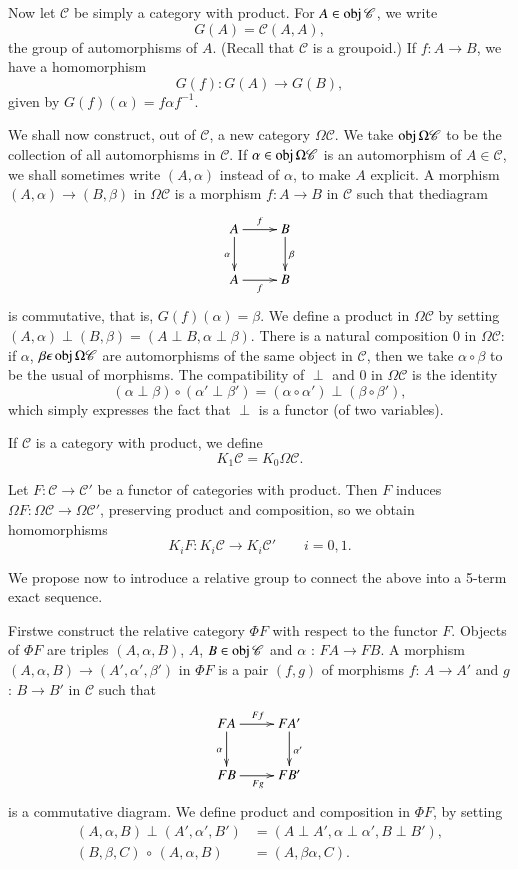 Now let $\mathscr{C}$ be simply a category with product. For $A \in
\operatorname{obj} \mathscr{C}$, we write 
$$
G(A) = \mathscr{C} (A, A),
$$
the group of automorphisms of $A$. (Recall that $\mathscr{C}$ is a
groupoid.) If $f: A \to B$, we have a homomorphism 
$$
G(f): G(A) \to G(B),
$$
given by $G(f) (\alpha) = f \alpha f^{-1}$.

We shall now construct, out of $\mathscr{C}$, a new category $\Omega
\mathscr{C}$. We take $\operatorname{obj} \Omega \mathscr{C}$ to be the collection of
all automorphisms in $\mathscr{C}$. If $\alpha \in \operatorname{obj} \Omega
\mathscr{C}$ is an automorphism of $A \in \mathscr{C}$, we shall
sometimes write $(A, \alpha)$ instead of $\alpha$, to make $A$
explicit. A morphism $(A, \alpha) \to (B, \beta)$ in $\Omega
\mathscr{C}$ is a morphism $f : A \to B$ in $\mathscr{C}$ such that
the\pageoriginale diagram 
\[
\xymatrix{
A \ar[r]^f \ar[d]_{\alpha} & B \ar[d]^{\beta}\\
A \ar[r]_f & B
}
\]
is commutative, that is, $G(f) (\alpha) = \beta$. We define a product
in $\Omega \mathscr{C}$ by setting $(A, \alpha) \perp (B, \beta) = (A
\perp B, \alpha \perp \beta)$. There is a natural composition 0 in
$\Omega \mathscr{C}$: if $\alpha$, $\beta \epsilon \operatorname{obj} \Omega
\mathscr{C}$ are automorphisms of the same object in $\mathscr{C}$,
then we take $\alpha \circ \beta$ to be the usual of morphisms. The
compatibility of $\perp$ and $0$ in $\Omega \mathscr{C}$ is the
identity 
$$
(\alpha \perp \beta) \circ (\alpha' \perp \beta') = ( \alpha \circ \alpha')
\perp (\beta \circ \beta'), 
$$
which simply expresses the fact that $\perp$ is a functor (of two
variables). 

\begin{defi*}%
If $\mathscr{C}$ is a category with product, we define
$$
K_1 \mathscr{C} = K_0 \Omega \mathscr{C}.
$$
\end{defi*}

Let $F : \mathscr{C} \to \mathscr{C}'$ be a functor of categories with
product. Then $F$ induces $\Omega F: \Omega \mathscr{C} \to \Omega
\mathscr{C}'$, preserving product and composition, so we obtain
homomorphisms 
$$
K_i F : K_i \mathscr{C} \to K_i \mathscr{C}' \qquad i=0,1.
$$

We propose now to introduce a relative group to connect the above into
a 5-term exact sequence. 

First\pageoriginale we construct the relative category $\Phi F$ with
respect to the 
functor $F$. Objects of $\Phi F$ are triples $(A, \alpha, B)$, $A$, $B
\in \operatorname{obj} \mathscr{C}$ and $\alpha $ :  $FA \to FB$. A morphism $(A,
\alpha, B) \to (A', \alpha', \beta')$ in $\Phi F$ is a pair $(f, g)$
of morphisms $f$: $A \to A'$ and $g$: $B \to B'$ in $\mathscr{C}$ such
that 
\[
\xymatrix{
FA \ar[r]^{Ff} \ar[d]_{\alpha} & FA' \ar[d]^{\alpha'} \\
FB \ar[r]_{Fg} & FB'
}
\]
is a commutative diagram. We define product and composition in $\Phi
F$, by setting 
\begin{align*}
 (A, \alpha, B) \perp (A', \alpha', B') & = (A \perp A', \alpha \perp
  \alpha', B \perp B'),\\ 
 (B, \beta, C) \, \circ \, (A, \alpha, B) & = (A, \beta \alpha, C). 
\end{align*}

